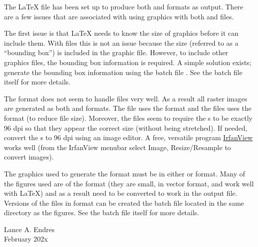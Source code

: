 The \LaTeX{} file has been set up to produce both  and  formats as output.  There are a few issues that are associated with using graphics with both  and  files.

The first issue is that \LaTeX{} needs to know the size of graphics before it can include them.  With  files this is not an issue because the size (referred to as a ``bounding box'') is included in the graphic file.  However, to include other graphics files, the bounding box information is required.  A simple solution exists; generate the bounding box information using the batch file .  See the batch file itself for more details.

The  format does not seem to handle  files very well.  As a result all raster images are generated as both  and  formats.  The  file uses the  format and the  files uses the  format (to reduce file size).  Moreover, the  files seem to require the s to be exactly 96 dpi so that they appear the correct size (without being stretched).  If needed, convert the s to 96 dpi using an image editor.  A free, versatile program \href{http://www.irfanview.com/}{IrfanView} works well (from the IrfanView menubar select Image, Resize/Resample to convert images).

The graphics used to generate the  format must be in either  or  format.  Many of the figures used are of the  format (they are small, in vector format, and work well with \LaTeX) and as a result need to be converted to work in the  output file.  Versions of the  files in  format can be created the batch file  located in the same directory as the figures. See the batch file itself for more details.


\noindent Lance A. Endres \\February 202x